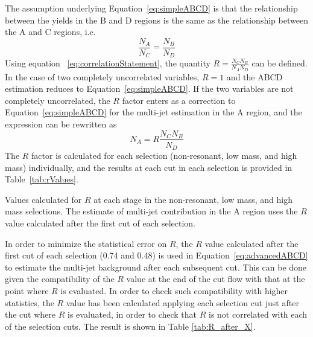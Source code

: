 The assumption underlying Equation~\ref{eq:simpleABCD} is that the relationship between the 
yields in the B and D regions is the same as the relationship between the A and C regions, i.e.
\begin{equation}
\frac{N_{A}}{N_{C}} = \frac{N_B}{N_D}
\label{eq:correlationStatement}
\end{equation}
Using equation ~\ref{eq:correlationStatement}, the quantity $R= \frac{N_{C} N_B}{N_{A} N_D}$ can be 
defined. In the case of two completely uncorrelated variables, $R=1$ and the ABCD estimation reduces 
to Equation~\ref{eq:simpleABCD}. If the two variables are not completely uncorrelated, the $R$ 
factor enters as a correction to Equation~\ref{eq:simpleABCD} for the multi-jet estimation in the A 
region, and the expression can be rewritten as
\begin{equation}
N_{A} = R \frac{N_C N_B}{N_D}
\label{eq:advancedABCD}
\end{equation}
The $R$ factor is calculated for each selection (non-resonant, low mass, and high mass) individually,
and the results at each cut in each selection is provided in
Table~\ref{tab:rValues}.


\begin{table}[h!]
\centering

\caption{Values calculated for $R$ at each stage in the non-resonant,
  low mass, and high mass selections. The estimate of multi-jet
  contribution in the A region uses the $R$ value calculated after the
  first cut of each selection.} \label{tab:rValues}
\end{table}
In order to minimize the statistical error on $R$, the $R$ value calculated after 
the first cut of each selection (0.74 and 0.48) is used in Equation~\ref{eq:advancedABCD} to estimate the multi-jet
background after each subsequent cut. This can be done given the
compatibility of the $R$ value at the end of the cut flow with that at
the point where $R$ is evaluated. In order to check such compatibility
with higher statistics, the $R$ value has been calculated applying
each selection cut just after the cut where $R$ is evaluated, in order
to check that $R$ is not correlated with each of the selection cuts.
The result is shown in Table \ref{tab:R_after_X}.

